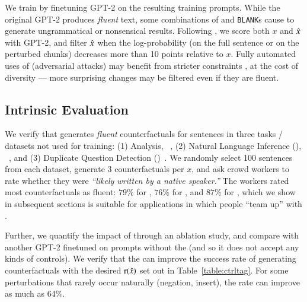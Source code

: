 We train \sysname by finetuning GPT-2 \cite{radford2019language} on the resulting training prompts.
While the original GPT-2 produces \emph{fluent} text,
some combinations of \tagstrs and \texttt{BLANK}s cause \sysname to generate ungrammatical or nonsensical results.
Following \citet{morris2020textattack}, we score both $x$ and $\hat{x}$ with GPT-2, and filter $\hat{x}$ when the log-probability (on the full sentence or on the perturbed chunks) decreases more than 10 points relative to $x$.
Fully automated uses of \sysname (\eg adversarial attacks) may benefit from stricter constraints \cite{morris2020textattack}, at the cost of diversity --- more surprising changes may be filtered even if they are fluent.


\subsection{Intrinsic Evaluation}
\label{subsec:intrinsic}



We verify that \sysname generates \emph{fluent} counterfactuals for sentences in three tasks / datasets not used for training: (1) \sst Analysis, \dsst~\cite{socher2013recursive},
(2) Natural Language Inference (\nli), \dnli~\cite{bowman-etal-2015-large}, and 
(3) Duplicate Question Detection (\dqqp)~\cite{wang2018glue}.
We randomly select 100 sentences from each dataset, generate 3 \sysname counterfactuals per $x$, and ask crowd workers to rate whether they were \emph{``likely written by a native speaker.''}
The workers rated most counterfactuals as fluent: $79\%$ for \dsst, $76\%$ for \dqqp, and $87\%$ for \dnli,  which we show in subsequent sections is suitable for applications in which people ``team up'' with \sysname.

Further, we quantify the impact of \tagstrs through an ablation study, and compare \sysname with another GPT-2 finetuned on prompts without the \tagstrshorts (and so it does not accept any kinds of controls). 
We verify that the \tagstrshorts can improve the success rate of generating counterfactuals with the desired $\operatorname*{r}(\hat{x})$ set out in Table~\ref{table:ctrltag}.
For some perturbations that rarely occur naturally (\eg negation, insert), the rate can improve as much as 64\%.

